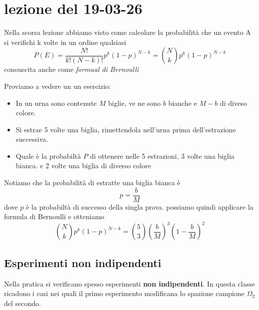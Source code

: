 \section{lezione del 19-03-26}
Nella scorsa lezione abbiamo visto come calcolare la probabilità che un evento A 
si verifichi k volte in un ordine qualsiasi
\[
    P(E) = \frac{N!}{k!(N - k)!}p^k(1 - p)^{N - k} = \binom{N}{k}p^k(1 - p)^{N - k}
\]
conouscita anche come \textit{formual di Bernoulli}

Proviamo a vedere un un esercizio: 
\begin{itemize}
    \item In un urna sono contenute $M$ biglie, ve ne sono $b$ bianche e $M - b$ di diveso colore.
    \item Si estrae 5  volte una biglia, rimettendola nell'urna prima dell'estrazione successiva.
    \item Quale è la probabiltà $P$ di ottenere nelle 5 estrazioni, 3 volte una biglia bianca.
        e 2 volte una biglia di diverso colore
\end{itemize}
Notiamo che la probabilità di estratte una biglia bianca è
\[
    p = \frac{b}{M}
\]
dove $p$ è la probabiltà di successo della singla prova.
possiamo quindi applicare la formula di Bernoulli e otteniamo
\[
    \binom{N}{k}p^k(1 - p)^{N-k} = \binom{5}{3}\left ( \frac{b}{M} \right)^3\left ( 1 -\frac{b}{M}\right)^2
\]
\subsection{Esperimenti non indipendenti}\label{sub:Esperimenti non indipendenti} %
Nella pratica si verificano spesso esperimenti \textbf{non indipendenti}. In questa
classe ricadono i casi nei quali il primo esperimento modificana lo spazione campione 
$\Omega_2$ del secondo. \\ 

